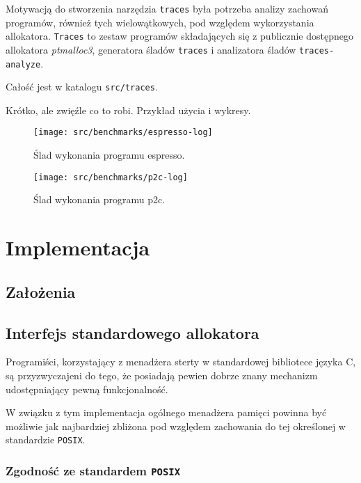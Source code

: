 \documentclass[12pt,a4paper,titlepage,twoside]{mwart}
\begin{document}
Motywacją do stworzenia narzędzia \texttt{traces} była potrzeba analizy
zachowań programów, również tych wielowątkowych, pod względem wykorzystania
allokatora. \texttt{Traces} to zestaw programów składających się z publicznie
dostępnego allokatora \textit{ptmalloc3}, generatora śladów \texttt{traces} i
analizatora śladów \texttt{traces-analyze}.

Całość jest w katalogu \texttt{src/traces}.

Krótko, ale zwięźle co to robi. Przykład użycia i wykresy.

\begin{figure}%
\centering
\texttt{[image: src/benchmarks/espresso-log]}
\caption{Ślad wykonania programu espresso.}

\vspace{0.5in}

\texttt{[image: src/benchmarks/p2c-log]}
\caption{Ślad wykonania programu p2c.}
\end{figure}

\newpage


\section{Implementacja}
\hypertarget{Implementacja}{}

\subsection{Założenia}

\newpage

\subsection{Interfejs standardowego allokatora}

\label{PosixMalloc}

Programiści, korzystający z menadżera sterty w standardowej bibliotece języka
C, są przyzwyczajeni do tego, że posiadają pewien dobrze znany mechanizm
udostępniający pewną funkcjonalność.

W związku z tym implementacja ogólnego menadżera pamięci powinna być możliwie
jak najbardziej zbliżona pod względem zachowania do tej określonej w
standardzie \texttt{POSIX}.

\subsubsection{Zgodność ze standardem \texttt{POSIX}}
\end{document}
